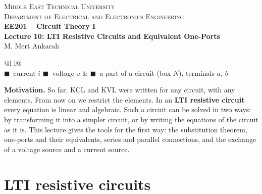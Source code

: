 \documentclass[11pt,a4paper]{article}
\newcommand{\Icol}[1]{\textcolor{ccur}{#1}}
\newcommand{\Vcol}[1]{\textcolor{cvolt}{#1}}
\begin{document}
\begin{center}
\begin{tcolorbox}[enhanced, colback=metured!5, colframe=metured, boxrule=1pt,
                  arc=3pt, left=10pt,right=10pt,top=7pt,bottom=7pt, width=\textwidth]
\begin{center}
  {\small\scshape Middle East Technical University}\\[2pt]
  {\small\scshape Department of Electrical and Electronics Engineering}\\[7pt]
  {\Large\bfseries\color{metured} EE201 -- Circuit Theory I}\\[4pt]
  {\large\bfseries Lecture 10: LTI Resistive Circuits and Equivalent One-Ports}\\[6pt]
  {\small M. Mert Ankaralı}
\end{center}
\end{tcolorbox}
\end{center}
\vspace{-0.5em}

\begin{center}
\small
\begin{tabular}{@{}l l@{}}
\toprule
{}\\
\midrule
\Icol{$\blacksquare$}~current $i$ \quad \Vcol{$\blacksquare$}~voltage $v$ &
\textcolor{metugray}{$\blacksquare$}~a part of a circuit (box $N$), terminals $a$, $b$\\
\bottomrule
\end{tabular}
\end{center}

\textbf{Motivation.} So far, KCL and KVL were written for any circuit, with any
elements. From now on we restrict the elements. In an \textbf{LTI resistive circuit} every
equation is linear and algebraic. Such a circuit can be solved in two ways: by transforming it
into a simpler circuit, or by writing the equations of the circuit as it is. This lecture gives
the tools for the first way: the
substitution theorem, one-ports and their equivalents, series and parallel connections, and
the exchange of a voltage source and a current source.

\section{LTI resistive circuits}
\end{document}
